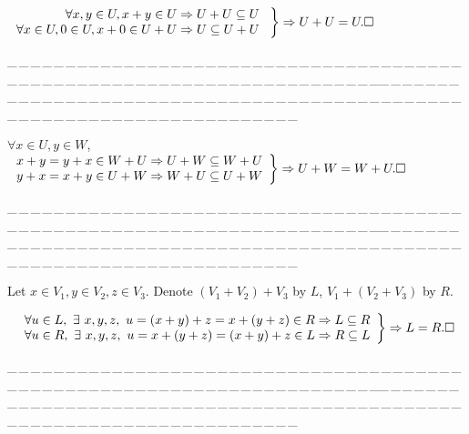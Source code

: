 \documentclass[a4paper, 11pt, UTF8]{article}
\def\Fbb{{\mathbb{F}}}
\def\apostrophe{{\forapos'}}
\def\ProblemEnding{{\tiny \_\,\_\,\_\,\_\,\_\,\_\,\_\,\_\,\_\,\_\,\_\,\_\,\_\,\_\,\_\,\_\,\_\,\_\,\_\,\_\,\_\,\_\,\_\,\_\,\_\,\_\,\_\,\_\,\_\,\_\,\_\,\_\,\_\,\_\,\_\,\_\,\_\,\_\,\_\,\_\,\_\,\_\,\_\,\_\,\_\,\_\,\_\,\_\,\_\,\_\,\_\,\_\,\_\,\_\,\_\,\_\,\_\,\_\,\_\,\_\,\_\,\_\,\_\,\_\,\_\,\_\,\_\,\_\,\_\,\_\,\_\_\,\_\,\_\,\_\,\_\,\_\,\_\,\_\,\_\,\_\,\_\,\_\,\_\,\_\,\_\,\_\,\_\,\_\,\_\,\_\,\_\,\_\,\_\,\_\,\_\,\_\,\_\,\_\,\_\,\_\,\_\,\_\,\_\,\_\,\_\,\_\,\_\,\_\,\_\,\_\,\_\,\_\,\_\,\_\,\_\,\_\,\_\,\_\,\_\,\_\,\_\,\_\,\_\,\_\,\_\,\_\,\_\,\_\,\_\,\_\,\_\,\_\,\_\,\_\,\_\,\_\,\_\,\_\,\_\,\_\,\_}}
\begin{document}
\begin{large}

$\MathRightBrace{r}{$
$\forall x,y\in U,x+y\in U\Rightarrow U+U\subseteq U\,\,\\ \forall x\in U,0\in U,x+0\in U+U\Rightarrow U\subseteq U+U$
$}\Rightarrow U+U=U.\hfill\square$\par\vspace{6pt}
\ProblemEnding\par

$\forall x\in U,y\in W$,
$\MathRightBrace{l}{
x+y=y+x\in W+U\Rightarrow U+W\subseteq W+U \\
y+x=x+y\in U+W\Rightarrow W+U\subseteq U+W
}\Rightarrow U+W=W+U.\hfill\square$\par
\vspace{6pt}
\ProblemEnding\par

\par\quad
Let $x\in V_1, y\in V_2, z\in V_3.$ Denote $(V_1+V_2)+V_3$ by $L$, $V_1+(V_2+V_3)$ by $R$. \par\,\,
{$\MathRightBrace{l}{
\forall u\in L,\,\,\exists\,\,x,y,z,\,\,u=(x+y)+z=x+(y+z)\in R\Rightarrow L\subseteq R\\
\forall u\in R,\,\,\exists\,\,x,y,z,\,\,u=x+(y+z)=(x+y)+z\in L\Rightarrow R\subseteq L
}\Rightarrow L=R.\hfill\square$}\par
\vspace{6pt}
\ProblemEnding\par


\end{large}
\end{document}
